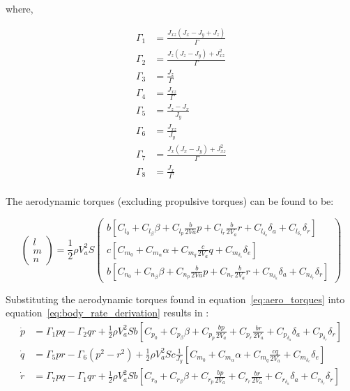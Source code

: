 where,

\begin{equation}
\begin{split}
\Gamma_1&=\frac{J_{xz}(J_x-J_y+J_z)}{\Gamma}\\
\Gamma_2&=\frac{J_z(J_z-J_y)+J_{xz}^2}{\Gamma}\\
\Gamma_3&=\frac{J_z}{\Gamma}\\
\Gamma_4&=\frac{J_{xz}}{\Gamma}\\
\Gamma_5&=\frac{J_z-J_x}{J_y}\\
\Gamma_6&=\frac{J_{xz}}{J_y}\\
\Gamma_7&=\frac{J_x(J_x-J_y)+J_{xz}^2}{\Gamma}\\
\Gamma_8&=\frac{J_x}{\Gamma}\\
\end{split}
\end{equation}

The aerodynamic torques (excluding propulsive torques) can be found to be:

\begin{equation}\label{eq:aero_torques}
\begin{pmatrix}
		l\\
		m\\
		n
	\end{pmatrix}
	=
	\frac{1}{2}\rho V_a^2S
	\begin{pmatrix}
		b\left[C_{l_0}+C_{l_\beta}\beta+C_{l_p}\frac{b}{2Va}p+C_{l_r}\frac{b}{2V_a}r+C_{l_{\delta_a}}\delta_a+C_{l_{\delta_r}}\delta_r\right]\\
		c\left[C_{m_0}+C_{m_\alpha}\alpha+C_{m_q}\frac{c}{2V_a}q+C_{m_{\delta_e}}\delta_e\right]\\
		b\left[C_{n_0}+C_{n_\beta}\beta+C_{n_p}\frac{b}{2Va}p+C_{n_r}\frac{b}{2V_a}r+C_{n_{\delta_a}}\delta_a+C_{n_{\delta_r}}\delta_r\right]
	\end{pmatrix}
\end{equation}

Substituting the aerodynamic torques found in equation~\ref{eq:aero_torques} into equation~\ref{eq:body_rate_derivation} results in \cite{beard2012small}:
\begin{equation}\label{eq:body_rate_equations}
\begin{split}
	\dot{p}&=\Gamma_1pq-\Gamma_2qr+\frac{1}{2}\rho V_a^2Sb\left[C_{p_0}+C_{p_\beta}\beta+C_{p_p}\frac{bp}{2V_a}+C_{p_r}\frac{br}{2V_a}+C_{p_{\delta_a}}\delta_a+C_{p_{\delta_r}}\delta_r\right]\\
	\dot{q}&=\Gamma_5pr-\Gamma_6(p^2-r^2)+\frac{1}{2}\rho V_a^2Sc\frac{1}{J_y}\left[C_{m_0}+C_{m_\alpha}\alpha+C_{m_q}\frac{cq}{2V_a}+C_{m_{\delta_e}}\delta_e\right]\\
	\dot{r}&=\Gamma_7pq-\Gamma_1qr+\frac{1}{2}\rho V_a^2Sb\left[C_{r_0}+C_{r_\beta}\beta+C_{r_p}\frac{bp}{2V_a}+C_{r_r}\frac{br}{2V_a}+C_{r_{\delta_a}}\delta_a+C_{r_{\delta_r}}\delta_r\right]
\end{split}	
\end{equation}


